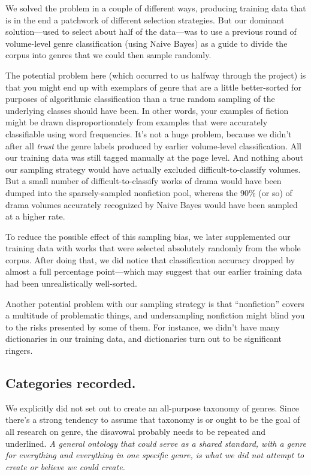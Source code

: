 \documentclass[paper=a4, fontsize=12pt]{scrartcl}
\numberwithin{equation}{section}		%
\numberwithin{figure}{section}			%
\numberwithin{table}{section}				%
\begin{document}
We solved the problem in a couple of different ways, producing training data that is in the end a patchwork of different selection strategies. But our dominant solution---used to select about half of the data---was to use a previous round of volume-level genre classification (using Naive Bayes) as a guide to divide the corpus into genres that we could then sample randomly. 

The potential problem here (which occurred to us halfway through the project) is that you might end up with exemplars of genre that are a little better-sorted for purposes of algorithmic classification than a true random sampling of the underlying classes should have been. In other words, your examples of fiction might be drawn disproportionately from examples that were accurately classifiable using word frequencies. It's not a huge problem, because we didn't after all \textit{trust} the genre labels produced by earlier volume-level classification. All our training data was still tagged manually at the page level. And nothing about our sampling strategy would have actually excluded difficult-to-classify volumes. But a small number of difficult-to-classify works of drama would have been dumped into the sparsely-sampled nonfiction pool, whereas the 90\% (or so) of drama volumes accurately recognized by Naive Bayes would have been sampled at a higher rate.

To reduce the possible effect of this sampling bias, we later supplemented our training data with works that were selected absolutely randomly from the whole corpus. After doing that, we did notice that classification accuracy dropped by almost a full percentage point---which may suggest that our earlier training data had been unrealistically well-sorted.

Another potential problem with our sampling strategy is that ``nonfiction'' covers a multitude of problematic things, and undersampling nonfiction might blind you to the risks presented by some of them. For instance, we didn't have many dictionaries in our training data, and dictionaries turn out to be significant ringers.

\subsection{Categories recorded.}

We explicitly did not set out to create an all-purpose taxonomy of genres. Since there's a strong tendency to assume that taxonomy is or ought to be the goal of all research on genre, the disavowal probably needs to be repeated and underlined. \textit{A general ontology that could serve as a shared standard, with a genre for everything and everything in one specific genre, is what we did not attempt to create or believe we could create.}
\end{document}
